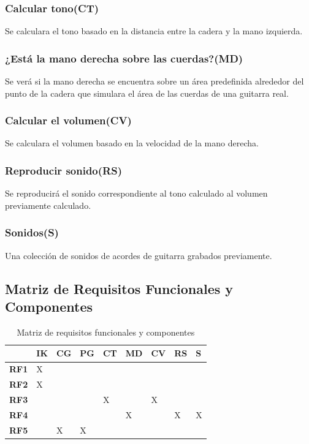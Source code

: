 \documentclass[a4paper,12pt]{article}
\begin{document}
\subsubsection{Calcular tono(CT)}
Se calculara el tono basado en la distancia entre la cadera y la mano izquierda.
\subsubsection{¿Está la mano derecha sobre las cuerdas?(MD)}
Se verá si la mano derecha se encuentra sobre un área predefinida alrededor del
punto de la cadera que simulara el área de las cuerdas de una guitarra real.
\subsubsection{Calcular el volumen(CV)}
Se calculara el volumen basado en la velocidad de la mano derecha.
\subsubsection{Reproducir sonido(RS)}
Se reproducirá el sonido correspondiente al tono calculado al volumen
previamente calculado.
\subsubsection{Sonidos(S)}
Una colección de sonidos de acordes de guitarra grabados previamente.
\subsection{Matriz de Requisitos Funcionales y Componentes}
\begin{table}[h!]
        \centering
        \begin{tabular}{|p{2cm}|p{2cm}|p{2cm}|p{2cm}|p{2cm}|p{2cm}|p{2cm}|p{2cm}|}
                \hline
                 & \textbf{IK} & \textbf{CG} & \textbf{PG} & \textbf{CT} & \textbf{MD} & \textbf{CV} & \textbf{RS} & \textbf{S} \\
                \hline
                \textbf{RF1} & X & & & & & & & \\
                \hline
                \textbf{RF2} & X & & & & & & & \\
                \hline
                \textbf{RF3} & & & & X & & X & & \\
                \hline
                \textbf{RF4} & & & & & X & & X & X \\
                \hline
                \textbf{RF5} & & X & X & & & & & \\
                \hline
        \end{tabular}
        \caption{Matriz de requisitos funcionales y componentes}
        \label{tab:matrizrequisitos}
\end{table}
\end{document}
